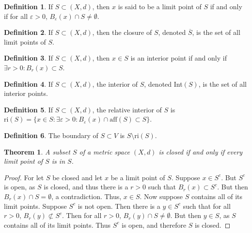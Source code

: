 \documentclass[oneside]{book}
\newtheorem{theorem}{Theorem}[section]
\theoremstyle{definition}
\newtheorem{definition}{Definition}[section]
\begin{document}
\begin{definition}
If $S\subset (X,d)$, then $x$ is said to be a limit point of $S$ if and only if for all $\varepsilon>0$, $B_{\varepsilon}(x)\cap S \ne \emptyset$.
\end{definition}

\begin{definition}
If $S\subset (X,d)$, then the closure of $S$, denoted $\overline{S}$, is the set of all limit points of $S$.
\end{definition}

\begin{definition}
If $S\subset (X,d)$, then $x\in S$ is an interior point if and only if $\exists r>0:B_{r}(x)\subset S$.
\end{definition}

\begin{definition}
If $S\subset (X,d)$, the interior of $S$, denoted Int$(S)$, is the set of all interior points.
\end{definition}

\begin{definition}
If $S\subset (X,d)$, the relative interior of $S$ is $\textrm{ri}(S)= \{x\in S:\exists \varepsilon>0:B_{\varepsilon}(x)\cap \textrm{aff}(S)\subset S\}$.
\end{definition}

\begin{definition}
The boundary of $S\subset V$ is $S\setminus \textrm{ri}(S)$.
\end{definition}

\begin{theorem}
A subset $S$ of a metric space $(X,d)$ is closed if and only if every limit point of $S$ is in $S$.
\end{theorem}
\begin{proof}
For let $S$ be closed and let $x$ be a limit point of $S$. Suppose $x\in S^c$. But $S^c$ is open, as $S$ is closed, and thus there is a $r>0$ such that $B_{r}(x)\subset S^c$. But then $B_{r}(x)\cap S = \emptyset$, a contradiction. Thus, $x\in S$. Now suppose $S$ contains all of its limit points. Suppose $S^c$ is not open. Then there is a $y\in S^c$ such that for all $r>0$, $B_{r}(y)\not \subset S^c$. Then for all $r>0$, $B_{r}(y)\cap S \ne \emptyset$. But then $y\in S$, as $S$ contains all of its limit points. Thus $S^c$ is open, and therefore $S$ is closed.
\end{proof}
\end{document}
